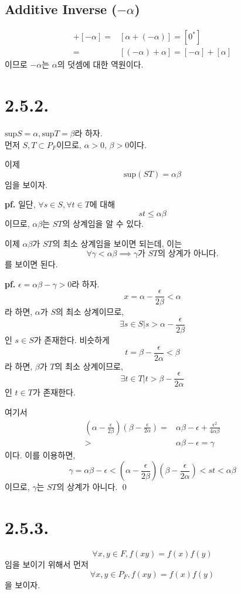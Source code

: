 \documentclass{article}
\begin{document}
\subsection{Additive Inverse ($-\alpha$)}
\begin{align*}
[\alpha] + [-\alpha] = & [\alpha + (-\alpha) ] = [0^*]\\
=& [(-\alpha) + \alpha] = [-\alpha] + [\alpha]
\end{align*}
이므로 $-\alpha$는 $\alpha$의 덧셈에 대한 역원이다.


\section{2.5.2.}
$\text{sup} S = \alpha, \text{sup} T = \beta$라 하자. \\
먼저 $S, T \subset P_F$이므로, $\alpha > 0$, $\beta > 0$이다.

이제
$$\text{sup} (ST) = \alpha \beta$$임을 보이자.

\textbf{pf.} 일단, $\forall s \in S, \forall t \in T$에 대해
$$ st \le \alpha \beta$$이므로, $\alpha \beta$는 $ST$의 상계임을 알 수 있다.

이제 $\alpha \beta$가 $ST$의 최소 상계임을 보이면 되는데, 이는 
$$ \forall \gamma < \alpha \beta \implies \gamma\text{가 } ST\text{의 상계가 아니다.} $$
를 보이면 된다.

\textbf{pf.}
$\epsilon = \alpha\beta - \gamma > 0$라 하자.
$$x = \alpha - \frac{\epsilon}{2 \beta} < \alpha $$
라 하면, $\alpha$가 $S$의 최소 상계이므로, 
$$\exists s \in S \bigg| s > \alpha - \frac{\epsilon}{2 \beta}$$
인 $s \in S$가 존재한다. 비슷하게
$$t = \beta - \frac{\epsilon}{2 \alpha} < \beta$$
라 하면, $\beta$가 $T$의 최소 상계이므로, 
$$\exists t \in T \bigg| t > \beta - \frac{\epsilon}{2 \alpha}$$
인 $t \in T$가 존재한다.

여기서
\begin{align*}
\left(\alpha - \frac{\epsilon}{2 \beta} \right) \left(\beta - \frac{\epsilon}{2 \alpha} \right) =&
\alpha \beta - \epsilon + \frac{\epsilon ^ 2}{4 \alpha \beta}\\
>& \alpha \beta - \epsilon = \gamma
\end{align*}
이다. 이를 이용하면,
$$\gamma = \alpha\beta - \epsilon < \left(\alpha - \frac{\epsilon}{2 \beta} \right) \left(\beta - \frac{\epsilon}{2 \alpha} \right) < st < \alpha \beta$$
이므로, $\gamma$는 $ST$의 상계가 아니다. \qed


\section{2.5.3.}
$$\forall x, y \in F ,  f(xy) = f(x)f(y)$$임을 보이기 위해서 먼저
$$\forall x, y \in P_F,  f(xy) = f(x)f(y)$$을 보이자.
\end{document}
